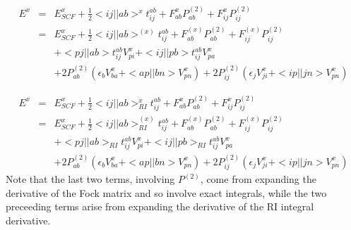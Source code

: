 \documentclass[fleqn,12pt]{article}
\newcommand{\half}{\frac{1}{2}}
\newcommand{\bra}{<\!}
\newcommand{\ket}{\!>}
\newcommand{\tijab}{{t_{ij}^{ab}}}
\newcommand{\Ptwo}{P^{(2)}}
\newcommand{\Fx}{F^{(x)}}
\newcommand{\intari}[2]{\bra #1 || #2 \ket_{RI}}
\begin{document}
\begin{eqnarray}
  E^x & = & E^x_{SCF} + \half \bra ij || ab \ket^x \tijab + F^x_{ab} \Ptwo_{ab}
  + F^x_{ij} \Ptwo_{ij} \\
 & = & E^x_{SCF} + \half \bra ij || ab \ket^{(x)} \tijab + \Fx_{ab} \Ptwo_{ab}
  + \Fx_{ij} \Ptwo_{ij} \\
 & & + \bra pj || ab \ket \tijab V^x_{pi} + \bra ij || pb \ket \tijab
 V^x_{pa} \nonumber\\
 & & + 2 \Ptwo_{ab} \left( \epsilon_b V^x_{ba} + \bra ap || bn \ket
   V^x_{pn} \right) +
   2 \Ptwo_{ij} \left( \epsilon_j V^x_{ji} + \bra ip || jn \ket
   V^x_{pn} \right) \nonumber
\end{eqnarray}


\begin{changebar}
\begin{eqnarray}
  E^x & = & E^x_{SCF} + \half \intari{ij}{ab}^{x} \tijab + F^x_{ab} \Ptwo_{ab}
  + F^x_{ij} \Ptwo_{ij} \\
 & = & E^x_{SCF} + \half \intari{ij}{ab}^{(x)} \tijab + \Fx_{ab} \Ptwo_{ab}
  + \Fx_{ij} \Ptwo_{ij} \\
 & & + \intari{pj}{ab} \tijab V^x_{pi} + \intari{ij}{pb} \tijab
 V^x_{pa} \nonumber\\
 & & + 2 \Ptwo_{ab} \left( \epsilon_b V^x_{ba} + \bra ap || bn \ket
   V^x_{pn} \right) +
   2 \Ptwo_{ij} \left( \epsilon_j V^x_{ji} + \bra ip || jn \ket
   V^x_{pn} \right) \nonumber
\end{eqnarray}
Note that the last two terms, involving $\Ptwo$, come from expanding
the derivative of the Fock matrix and so involve exact integrals,
while the two preceeding terms arise from expanding the derivative of
the RI integral derivative.
\end{changebar}
\end{document}
